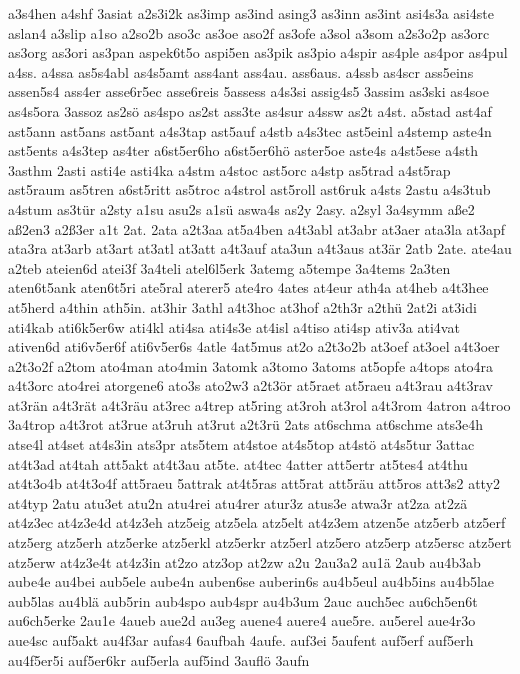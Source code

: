 {a3s4hen
a4shf
3asiat
a2s3i2k
as3imp
as3ind
asing3
as3inn
as3int
asi4s3a
asi4ste
aslan4
a3slip
a1so
a2so2b
aso3c
as3oe
aso2f
as3ofe
a3sol
a3som
a2s3o2p
as3orc
as3org
as3ori
as3pan
aspek6t5o
aspi5en
as3pik
as3pio
a4spir
as4ple
as4por
as4pul
a4ss.
a4ssa
as5s4abl
as4s5amt
ass4ant
ass4au.
ass6aus.
a4ssb
as4scr
ass5eins
assen5s4
ass4er
asse6r5ec
asse6reis
5assess
a4s3si
assig4s5
3assim
as3ski
as4soe
as4s5ora
3assoz
as2sö
as4spo
as2st
ass3te
as4sur
a4ssw
as2t
a4st.
a5stad
ast4af
ast5ann
ast5ans
ast5ant
a4s3tap
ast5auf
a4stb
a4s3tec
ast5einl
a4stemp
aste4n
ast5ents
a4s3tep
as4ter
a6st5er6ho
a6st5er6hö
aster5oe
aste4s
a4st5ese
a4sth
3asthm
2asti
asti4e
asti4ka
a4stm
a4stoc
ast5orc
a4stp
as5trad
a4st5rap
ast5raum
as5tren
a6st5ritt
as5troc
a4strol
ast5roll
ast6ruk
a4sts
2astu
a4s3tub
a4stum
as3tür
a2sty
a1su
asu2s
a1sü
aswa4s
as2y
2asy.
a2syl
3a4symm
aße2
aß2en3
a2ß3er
a1t
2at.
2ata
a2t3aa
at5a4ben
a4t3abl
at3abr
at3aer
ata3la
at3apf
ata3ra
at3arb
at3art
at3atl
at3att
a4t3auf
ata3un
a4t3aus
at3är
2atb
2ate.
ate4au
a2teb
ateien6d
atei3f
3a4teli
atel6l5erk
3atemg
a5tempe
3a4tems
2a3ten
aten6t5ank
aten6t5ri
ate5ral
aterer5
ate4ro
4ates
at4eur
ath4a
at4heb
a4t3hee
at5herd
a4thin
ath5in.
at3hir
3athl
a4t3hoc
at3hof
a2th3r
a2thü
2at2i
at3idi
ati4kab
ati6k5er6w
ati4kl
ati4sa
ati4s3e
at4isl
a4tiso
ati4sp
ativ3a
ati4vat
ativen6d
ati6v5er6f
ati6v5er6s
4atle
4at5mus
at2o
a2t3o2b
at3oef
at3oel
a4t3oer
a2t3o2f
a2tom
ato4man
ato4min
3atomk
a3tomo
3atoms
at5opfe
a4tops
ato4ra
a4t3orc
ato4rei
atorgene6
ato3s
ato2w3
a2t3ör
at5raet
at5raeu
a4t3rau
a4t3rav
at3rän
a4t3rät
a4t3räu
at3rec
a4trep
at5ring
at3roh
at3rol
a4t3rom
4atron
a4troo
3a4trop
a4t3rot
at3rue
at3ruh
at3rut
a2t3rü
2ats
at6schma
at6schme
ats3e4h
atse4l
at4set
at4s3in
ats3pr
ats5tem
at4stoe
at4s5top
at4stö
at4s5tur
3attac
at4t3ad
at4tah
att5akt
at4t3au
at5te.
at4tec
4atter
att5ertr
at5tes4
at4thu
at4t3o4b
at4t3o4f
att5raeu
5attrak
at4t5ras
att5rat
att5räu
att5ros
att3s2
atty2
at4typ
2atu
atu3et
atu2n
atu4rei
atu4rer
atur3z
atus3e
atwa3r
at2za
at2zä
at4z3ec
at4z3e4d
at4z3eh
atz5eig
atz5ela
atz5elt
at4z3em
atzen5e
atz5erb
atz5erf
atz5erg
atz5erh
atz5erke
atz5erkl
atz5erkr
atz5erl
atz5ero
atz5erp
atz5ersc
atz5ert
atz5erw
at4z3e4t
at4z3in
at2zo
atz3op
at2zw
a2u
2au3a2
au1ä
2aub
au4b3ab
aube4e
au4bei
aub5ele
aube4n
auben6se
auberin6s
au4b5eul
au4b5ins
au4b5lae
aub5las
au4blä
aub5rin
aub4spo
aub4spr
au4b3um
2auc
auch5ec
au6ch5en6t
au6ch5erke
2au1e
4aueb
aue2d
au3eg
auene4
auere4
aue5re.
au5erel
aue4r3o
aue4sc
auf5akt
au4f3ar
aufas4
6aufbah
4aufe.
auf3ei
5aufent
auf5erf
auf5erh
au4f5er5i
auf5er6kr
auf5erla
auf5ind
3auflö
3aufn
}
